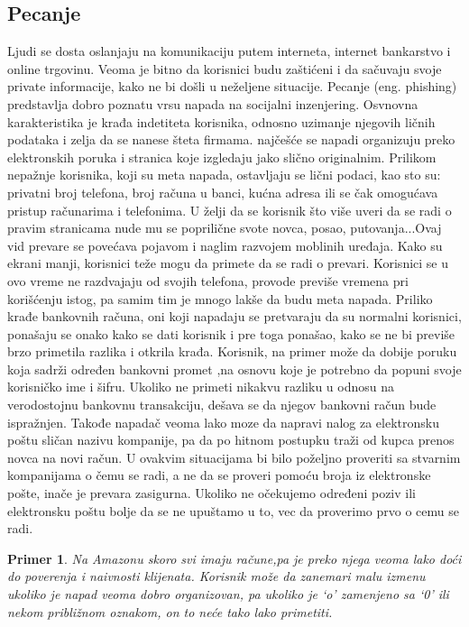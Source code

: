 \documentclass[a4paper]{article}
\newtheorem{primer}{Primer}[section]
\begin{document}
\subsection{Pecanje}
\label{subsec:podnaslovIP2}

Ljudi se dosta oslanjaju na komunikaciju putem interneta, internet bankarstvo i	online trgovinu. Veoma je bitno da korisnici budu zaštićeni i da sačuvaju svoje private informacije, kako ne bi došli u neželjene situacije. Pecanje (eng. phishing) predstavlja dobro poznatu vrsu napada na socijalni inzenjering. Osvnovna karakteristika je krađa indetiteta korisnika, odnosno uzimanje njegovih ličnih podataka i zelja da se nanese šteta firmama. najčešće se napadi organizuju preko elektronskih poruka i stranica koje izgledaju jako slično originalnim. Prilikom nepažnje korisnika, koji su meta napada, ostavljaju se lični podaci, kao sto su:  privatni broj telefona, broj računa u banci, kućna adresa ili se čak  omogućava pristup računarima i telefonima. U želji da se korisnik što više uveri da se radi o pravim stranicama nude mu se poprilične svote novca, posao, putovanja...Ovaj vid prevare se povećava pojavom i naglim razvojem moblinih uređaja. Kako su ekrani manji, korisnici teže mogu da primete da se radi o prevari. Korisnici se u ovo vreme ne razdvajaju od svojih telefona, provode previše vremena pri korišćenju istog, pa samim tim je mnogo lakše da budu meta napada. Priliko krađe bankovnih računa, oni koji napadaju se pretvaraju da su normalni korisnici, ponašaju se onako kako se dati korisnik i pre toga ponašao, kako se ne bi previše brzo primetila razlika i otkrila krađa. 
Korisnik, na primer može da dobije poruku  koja sadrži određen bankovni promet ,na osnovu koje je potrebno da popuni svoje korisničko ime i šifru. Ukoliko ne primeti nikakvu razliku u odnosu na verodostojnu bankovnu transakciju, dešava se da njegov bankovni račun bude ispražnjen. Takođe napadač veoma lako moze da napravi nalog za elektronsku poštu sličan nazivu kompanije, pa da po hitnom postupku traži od kupca prenos novca na novi račun. U ovakvim situacijama bi bilo poželjno proveriti sa stvarnim kompanijama o čemu se radi, a ne da se proveri pomoću broja iz elektronske pošte, inače je prevara zasigurna. Ukoliko ne očekujemo određeni poziv ili elektronsku poštu bolje da se ne upuštamo u to, vec da proverimo prvo o cemu se radi.
\begin{primer}
Na Amazonu skoro svi imaju račune,pa je preko njega veoma lako doći do poverenja i naivnosti klijenata. Korisnik može da zanemari malu izmenu ukoliko je napad veoma dobro organizovan, pa ukoliko je ‘o’ zamenjeno sa ‘0’  ili nekom približnom oznakom, on to neće tako lako primetiti. \cite{6exp}
\end{primer}
\end{document}
